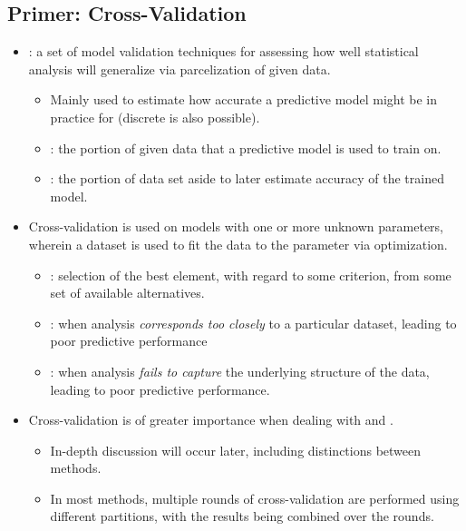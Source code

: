 \begin{itemize}
  \subsection{Primer: Cross-Validation}
    \begin{itemize}
    \item {}: a set of model validation techniques for assessing how well statistical analysis will generalize via parcelization of given data. 
      \begin{itemize}
        \item Mainly used to estimate how accurate a predictive model might be in practice for \hyperref[Subsection: Data Types]{} (discrete is also possible).
        \item {}: the portion of given data that a predictive model is used to train on. 
        \item {}: the portion of data set aside to later estimate accuracy of the trained model.
      \end{itemize}
    \item Cross-validation is used on models with one or more unknown parameters, wherein a dataset is used to fit the data to the parameter via optimization.
      \begin{itemize}
        \item {}: selection of the best element, with regard to some criterion, from some set of available alternatives.
        \item {}: when analysis \emph{corresponds too closely} to a particular dataset, leading to poor predictive performance
        \item {}: when analysis \emph{fails to capture} the underlying structure of the data, leading to poor predictive performance.
      \end{itemize}
    \item Cross-validation is of greater importance when dealing with \hyperref[Chapter: Regression]{} and \hyperref[Chapter: Confidence Intervals]{}.
      \begin{itemize}
        \item In-depth discussion will occur later, including distinctions between \hyperref[Subsection: Exhaustive vs. Non-Exhaustive]{} methods. 
        \item In most methods, multiple rounds of cross-validation are performed using different partitions, with the results being combined over the rounds.
      \end{itemize}
  \end{itemize}


\end{itemize}
